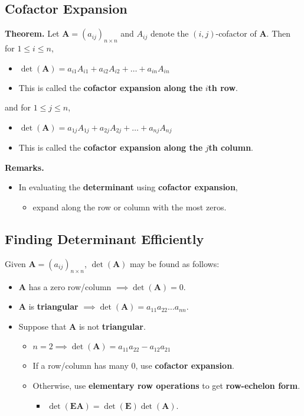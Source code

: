 \documentclass[../ma2001_notes.tex]{subfiles}
\begin{document}
\subsection{Cofactor Expansion}
\textbf{Theorem.} Let \(\bm{A}=(a_{ij})_{n\times n}\) and \(A_{ij}\) denote the \((i,j)\)-cofactor of \(\bm{A}\). Then for \(1\leq i\leq n\),
\begin{itemize}
	\item\(\det(\bm{A})=a_{i1}A_{i1}+a_{i2}A_{i2}+\ldots+a_{in}A_{in}\)
	\item This is called the \textbf{cofactor expansion along the} \(i\)\textbf{th row}.
\end{itemize}
and for \(1\leq j\leq n\),
\begin{itemize}
	\item\(\det(\bm{A})=a_{1j}A_{1j}+a_{2j}A_{2j}+\ldots+a_{nj}A_{nj}\)
	\item This is called the \textbf{cofactor expansion along the} \(j\)\textbf{th column}.
\end{itemize}
\textbf{Remarks.}
\begin{itemize}
	\item In evaluating the \textbf{determinant} using \textbf{cofactor expansion},
	\begin{itemize}
		\item expand along the row or column with the most zeros.
	\end{itemize}
\end{itemize}

\subsection{Finding Determinant Efficiently}
Given \(\bm{A}=(a_{ij})_{n\times n}\), \(\det(\bm{A})\) may be found as follows:
\begin{itemize}
	\item\(\bm{A}\) has a zero row/column \(\implies\det(\bm{A})=0\).
	\item\(\bm{A}\) is \textbf{triangular} \(\implies\det(\bm{A})=a_{11}a_{22}\ldots a_{nn}\).
	\item Suppose that \(\bm{A}\) is not \textbf{triangular}.
	\begin{itemize}
		\item\(n=2\implies\det(\bm{A})=a_{11}a_{22}-a_{12}a_{21}\)
		\item If a row/column has many \(0\), use \textbf{cofactor expansion}.
		\item Otherwise, use \textbf{elementary row operations} to get \textbf{row-echelon form}.
		\begin{itemize}
			\item\(\det(\bm{EA})=\det(\bm{E})\det(\bm{A})\).
		\end{itemize}
	\end{itemize}
\end{itemize}
\end{document}
